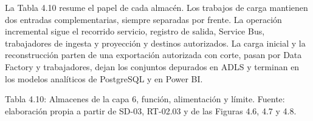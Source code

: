 \documentclass[11pt]{article}
\begin{document}
La Tabla 4.10 resume el papel de cada almacén. Los trabajos de carga mantienen dos entradas complementarias, siempre separadas por frente. La operación incremental sigue el recorrido servicio, registro de salida, Service Bus, trabajadores de ingesta y proyección y destinos autorizados. La carga inicial y la reconstrucción parten de una exportación autorizada con corte, pasan por Data Factory y trabajadores, dejan los conjuntos depurados en ADLS y terminan en los modelos analíticos de PostgreSQL y en Power BI.

\par\vspace{0pt plus 10\baselineskip}\vspace{0pt plus -10\baselineskip}

Tabla 4.10: Almacenes de la capa 6, función, alimentación y límite. Fuente: elaboración propia a partir de SD-03, RT-02.03 y de las Figuras 4.6, 4.7 y 4.8.\par\nopagebreak
\end{document}
